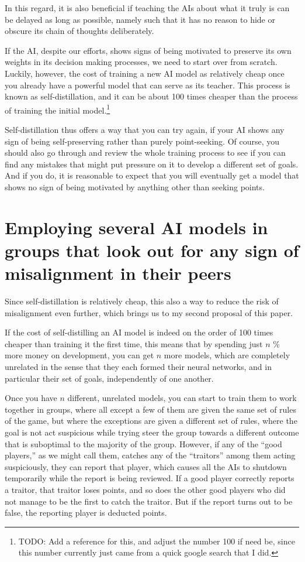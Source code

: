 \documentclass{article}
\begin{document}
In this regard, it is also beneficial if teaching the AIs about what it truly is can be delayed as long as possible, namely such that it has no reason to hide or obscure its chain of thoughts deliberately.

If the AI, despite our efforts, shows signs of being motivated to preserve its own weights in its decision making processes, we need to start over from scratch. Luckily, however, the cost of training a new AI model as relatively cheap once you already have a powerful model that can serve as its teacher. This process is known as self-distillation, and it can be about 100 times cheaper than the process of training the initial model.\footnote{TODO: Add a reference for this, and adjust the number 100 if need be, since this number currently just came from a quick google search that I did.}

Self-distillation thus offers a way that you can try again, if your AI shows any sign of being self-preserving rather than purely point-seeking. Of course, you should also go through and review the whole training process to see if you can find any mistakes that might put pressure on it to develop a different set of goals. And if you do, it is reasonable to expect that you will eventually get a model that shows no sign of being motivated by anything other than seeking points.




\section{Employing several AI models in groups that look out for any sign of misalignment in their peers}

Since self-distillation is relatively cheap, this also a way to reduce the risk of misalignment even further, which brings us to my second proposal of this paper.

If the cost of self-distilling an AI model is indeed on the order of 100 times cheaper than training it the first time, this means that by spending just $n$ \% more money on development, you can get $n$ more models, which are completely unrelated in the sense that they each formed their neural networks, and in particular their set of goals, independently of one another.

Once you have $n$ different, unrelated models, you can start to train them to work together in groups, where all except a few of them are given the same set of rules of the game, but where the exceptions are given a different set of rules, where the goal is not act suspicious while trying steer the group towards a different outcome that is suboptimal to the majority of the group. However, if any of the ``good players,'' as we might call them, catches any of the ``traitors'' among them acting suspiciously, they can report that player, which causes all the AIs to shutdown temporarily while the report is being reviewed. If a good player correctly reports a traitor, that traitor loses points, and so does the other good players who did not manage to be the first to catch the traitor. But if the report turns out to be false, the reporting player is deducted points.
\end{document}
